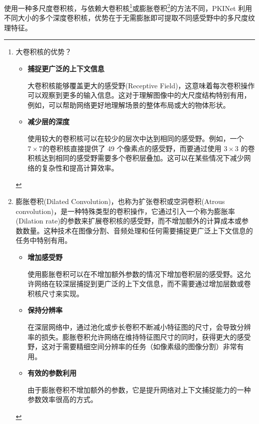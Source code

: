 \documentclass[a4paper]{ctexart}
\begin{document}
		使用一种多尺度卷积核，与依赖大卷积核\footnote{
		
		大卷积核的优势？
		
		\begin{itemize}
			
			\item[1)] \textbf{捕捉更广泛的上下文信息}
			
			大卷积核能够覆盖更大的感受野(Receptive Field)，这意味着每次卷积操作可以观察到更多的输入信息。这对于理解图像中的大尺度结构特别有用，例如，可以帮助网络更好地理解场景的整体布局或大的物体形状。
			
			\item[2)] \textbf{减少层的深度}
			
			使用较大的卷积核可以在较少的层次中达到相同的感受野。例如，一个$7 \times 7$的卷积核直接提供了 49 个像素点的感受野，而要通过使用 $3 \times 3$ 的卷积核达到相同的感受野需要多个卷积层叠加。这可以在某些情况下减少网络的复杂性和提高计算效率。
			
		\end{itemize}
		
		}或膨胀卷积\footnote{
		
		膨胀卷积(Dilated Convolution)，也称为扩张卷积或空洞卷积(Atrous convolution)，是一种特殊类型的卷积操作，它通过引入一个称为膨胀率(Dilation rate)的参数来扩展卷积核的感受野，而不增加额外的计算成本或参数数量。这种技术在图像分割、音频处理和任何需要捕捉更广泛上下文信息的任务中特别有用。
		
		\begin{itemize}
			
			\item[(1)] \textbf{增加感受野}
			
			使用膨胀卷积可以在不增加额外参数的情况下增加卷积层的感受野。这允许网络在较深层捕捉到更广泛的上下文信息，而不需要通过增加层数或卷积核尺寸来实现。
			
			\item[(2)] \textbf{保持分辨率}
			
			在深层网络中，通过池化或步长卷积不断减小特征图的尺寸，会导致分辨率的损失。膨胀卷积允许网络在维持特征图尺寸的同时，获得更大的感受野，这对于需要精细空间分辨率的任务（如像素级的图像分割）非常有用。
			
			\item[(3)] \textbf{有效的参数利用}
			
			由于膨胀卷积不增加额外的参数，它是提升网络对上下文捕捉能力的一种参数效率很高的方式。
			
		\end{itemize}
		
		}的方法不同，PKINet 利用不同大小的多个深度卷积核，优势在于无需膨胀即可提取不同感受野中的多尺度纹理特征。
		
\end{document}
